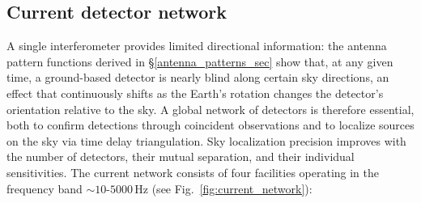 \subsection{Current detector network}
\label{noise_amplitude}

A single interferometer provides limited directional information: the antenna pattern functions derived in \S\ref{antenna_patterns_sec} show that, at any given time, a ground-based detector is nearly blind along certain sky directions, an effect that continuously shifts as the Earth's rotation changes the detector's orientation relative to the sky. A global network of detectors is therefore essential, both to confirm detections through coincident observations and to localize sources on the sky via time delay triangulation. Sky localization precision improves with the number of detectors, their mutual separation, and their individual sensitivities. The current network consists of four facilities operating in the frequency band $\sim\!10$-$5000$\,Hz (see Fig.~\ref{fig:current_network}):


